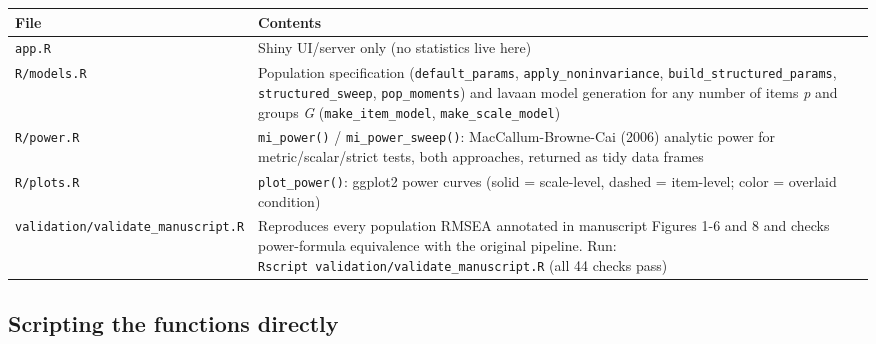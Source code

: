 \documentclass[
]{article}
\newcounter{none} %
\begin{document}
{\def\LTcaptype{none} %
\begin{longtable}[]{@{}
  >{\raggedright\arraybackslash}p{}
  >{\raggedright\arraybackslash}p{}@{}}
\toprule\noalign{}
\begin{minipage}[b]{\linewidth}\raggedright
File
\end{minipage} & \begin{minipage}[b]{\linewidth}\raggedright
Contents
\end{minipage} \\
\midrule\noalign{}
\endhead
\bottomrule\noalign{}
\endlastfoot
\texttt{app.R} & Shiny UI/server only (no statistics live here) \\
\texttt{R/models.R} & Population specification
(\texttt{default\_params}, \texttt{apply\_noninvariance},
\texttt{build\_structured\_params}, \texttt{structured\_sweep},
\texttt{pop\_moments}) and lavaan model generation for any number of
items \emph{p} and groups \emph{G} (\texttt{make\_item\_model},
\texttt{make\_scale\_model}) \\
\texttt{R/power.R} & \texttt{mi\_power()} / \texttt{mi\_power\_sweep()}:
MacCallum-Browne-Cai (2006) analytic power for metric/scalar/strict
tests, both approaches, returned as tidy data frames \\
\texttt{R/plots.R} & \texttt{plot\_power()}: ggplot2 power curves (solid
= scale-level, dashed = item-level; color = overlaid condition) \\
\texttt{validation/validate\_manuscript.R} & Reproduces every population
RMSEA annotated in manuscript Figures 1-6 and 8 and checks power-formula
equivalence with the original pipeline. Run:
\texttt{Rscript\ validation/validate\_manuscript.R} (all 44 checks
pass) \\
\end{longtable}
}

\subsection{Scripting the functions
directly}\label{scripting-the-functions-directly}
\end{document}
